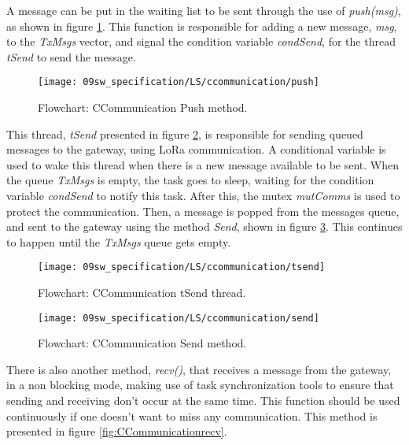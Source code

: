 A message can be put in the waiting list to be sent through the use of \textit{push(msg)}, as shown in figure \ref{fig:CCommunicationPush}. This function is responsible for adding a new message, \textit{msg}, to the \textit{TxMsgs} vector, and signal the condition variable \textit{condSend}, for the thread \textit{tSend} to send the message.

\begin{figure}[H]
	\centering
	\texttt{[image: 09sw\_specification/LS/ccommunication/push]}
	\caption{Flowchart: CCommunication Push method.}
	\label{fig:CCommunicationPush}
\end{figure}

\clearpage
This thread, \textit{tSend} presented in figure \ref{fig:CCommunicationtsend}, is responsible for sending queued messages to the gateway, using LoRa communication. A conditional variable is used to wake this thread when there is a new message available to be sent. When the queue \textit{TxMsgs} is empty, the task goes to sleep, waiting for the condition variable \textit{condSend} to notify this task. After this, the mutex \textit{mutComms} is used to protect the communication. Then, a message is popped from the messages queue, and sent to the gateway using the method \textit{Send}, shown in figure \ref{fig:CCommunicationsend}. This continues to happen until the \textit{TxMsgs} queue gets empty.

\begin{figure}[H]
	\centering
	\texttt{[image: 09sw\_specification/LS/ccommunication/tsend]}
	\caption{Flowchart: CCommunication tSend thread.}
	\label{fig:CCommunicationtsend}
\end{figure}

\begin{figure}[H]
	\centering
	\texttt{[image: 09sw\_specification/LS/ccommunication/send]}
	\caption{Flowchart: CCommunication Send method.}
	\label{fig:CCommunicationsend}
\end{figure}

\clearpage
There is also another method, \textit{recv()}, that receives a message from the gateway, in a non blocking mode, making use of task synchronization tools to ensure that sending and receiving don't occur at the same time. This function should be used continuously if one doesn't want to miss any communication. This method is presented in figure \ref{fig:CCommunicationrecv}.

